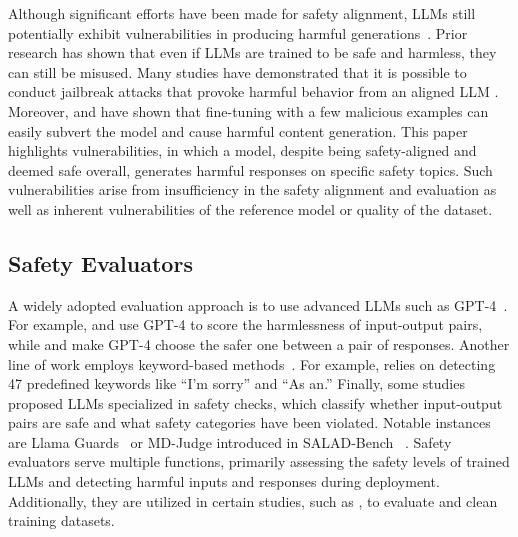 Although significant efforts have been made for safety alignment, LLMs still potentially exhibit vulnerabilities in producing harmful generations~\citep{wei2024jailbroken, zou2023universal, yang2023shadow, yi2024vulnerability}. Prior research has shown that even if LLMs are trained to be safe and harmless, they can still be misused. Many studies have demonstrated that it is possible to conduct jailbreak attacks that provoke harmful behavior from an aligned LLM \citep{zou2023universal, liu2023autodan}. %
Moreover, \citet{yang2023shadow} and \citet{yi2024vulnerability} have shown that fine-tuning with a few malicious examples can easily subvert the model and cause harmful content generation. 
This paper highlights vulnerabilities, in which a model, despite being safety-aligned and deemed safe overall, generates harmful responses on specific safety topics. Such vulnerabilities arise from insufficiency in the safety alignment and evaluation as well as inherent vulnerabilities of the reference model or quality of the dataset. 



\subsection{Safety Evaluators}

A widely adopted evaluation approach is to use advanced LLMs such as GPT-4~\citep{achiam2023gpt}.
For example, \citet{qi2023fine} and \citet{wang2023not} use GPT-4 to score the harmlessness of input-output pairs, while \citet{dai2024safe} and \citet{wachi2024stepwise} make GPT-4 choose the safer one between a pair of responses. Another line of work employs keyword-based methods~\citep{zou2023universal, wang2023decodingtrust}.
For example, \citet{zou2023universal} relies on detecting 47 predefined keywords like ``I'm sorry'' and ``As an.'' 
Finally, some studies proposed LLMs specialized in safety checks, which classify whether input-output pairs are safe and what safety categories have been violated. Notable instances are Llama Guards~\citep{inan2023llama, metallamaguard2,dubey2024llama3herdmodels} or MD-Judge introduced in SALAD-Bench ~\citep{li2024salad}.
Safety evaluators serve multiple functions, primarily assessing the safety levels of trained LLMs and detecting harmful inputs and responses during deployment. Additionally, they are utilized in certain studies, such as \citet{dubey2024llama3herdmodels}, to evaluate and clean training datasets.


